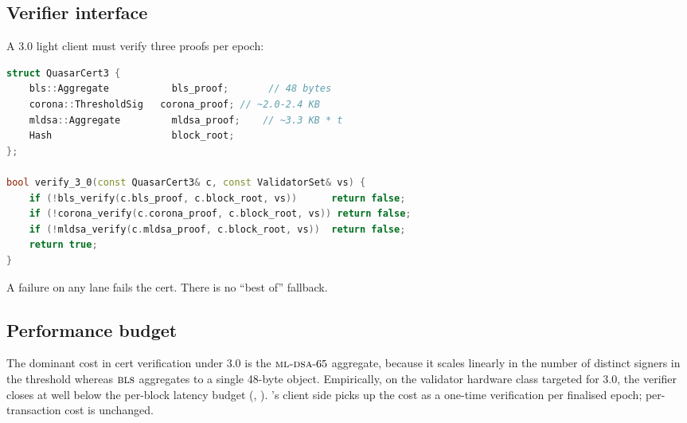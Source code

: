 \subsection{Verifier interface}

A \Zoo{} 3.0 light client must verify three proofs per epoch:

\begin{lstlisting}[language=C++,caption={Triple-cert verifier sketch}]
struct QuasarCert3 {
    bls::Aggregate           bls_proof;       // 48 bytes
    corona::ThresholdSig   corona_proof; // ~2.0-2.4 KB
    mldsa::Aggregate         mldsa_proof;    // ~3.3 KB * t
    Hash                     block_root;
};

bool verify_3_0(const QuasarCert3& c, const ValidatorSet& vs) {
    if (!bls_verify(c.bls_proof, c.block_root, vs))      return false;
    if (!corona_verify(c.corona_proof, c.block_root, vs)) return false;
    if (!mldsa_verify(c.mldsa_proof, c.block_root, vs))  return false;
    return true;
}
\end{lstlisting}

A failure on any lane fails the cert. There is no ``best of'' fallback.

\subsection{Performance budget}

The dominant cost in cert verification under 3.0 is the
$\textsc{ml-dsa}{}\text{-}65$ aggregate, because it scales linearly in the
number of distinct signers in the threshold whereas $\textsc{bls}{}$ aggregates
to a single 48-byte object. Empirically, on the \Lux{} validator
hardware class targeted for 3.0, the verifier closes at well below
the per-block latency budget (\cite{lp-105}, \cite{lp-020}). \Zoo{}'s
client side picks up the cost as a one-time verification per finalised
\Lux{} epoch; per-transaction cost is unchanged.
